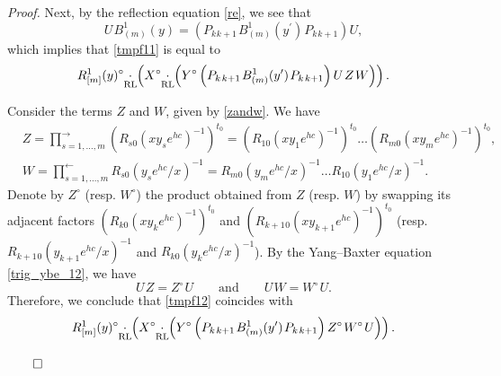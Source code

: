 \documentclass[12pt,a4paper,reqno]{amsart}
\theoremstyle{stil}
\theoremstyle{defi}
\theoremstyle{defi}
\theoremstyle{stil}
\theoremstyle{stil}
\theoremstyle{stil}
\theoremstyle{prim}
\newenvironment{prf}{\noindent \textit{Proof.}}{\null\hfill$\qed$\hskip
2mm\vskip 2mm}
\newcommand{\Fand}{\qquad\text{and}\qquad}
\newcommand{\beq}{\begin{equation}}
\newcommand{\eeq}{\end{equation}}
\newcommand{\ts}{\hspace{1pt}}
\newcommand{\cdotrl}{\mathop{\hspace{-2pt}\underset{\text{RL}}{\cdot}\hspace{-2pt}}}
\begin{document}
\begin{prf}
Next, by the reflection equation \eqref{re}, we see that
$$
U\ts B_{(m)}^1(y)=\left(P_{k\ts k+1}\ts
B_{(m)}^1(y^\prime)\ts
P_{k\ts k+1}\right) U,
$$
which implies that \eqref{tmpf11} is equal to
\beq\label{tmpf12}
	R_{[m]}^1 (y)^\circ \cdotrl 
\left(X^\circ \cdotrl\left(
 Y^\circ   \left(P_{k\ts k+1}\ts
B_{(m)}^1(y^\prime)\ts
P_{k\ts k+1}\right)  U\ts Z  \ts W \right) 
\right).
\eeq

Consider the terms $Z$ and $W$, given by \eqref{zandw}.
We have
\begin{align*}
& Z=\prod_{s=1,\ldots ,m  }^{\longrightarrow}
\left(R_{s0}(xy_s e^{ hc })^{-1}\right)^{t_0}=
\left(R_{10}(xy_1 e^{ hc })^{-1}\right)^{t_0}\ldots 
\left(R_{m0}(xy_m e^{ hc })^{-1}\right)^{t_0},\\
&W=\prod_{s=1,\ldots ,m  }^{\longleftarrow}
R_{s0}( y_s e^{ hc }/x)^{-1} 
=R_{m0}( y_m e^{ hc }/x)^{-1}  \ldots
 R_{10}( y_1 e^{ hc }/x)^{-1}  
.
\end{align*}
Denote by $Z^\circ$ (resp.  $W^\circ$) the  product obtained from $Z$ (resp. $W$) by swapping its adjacent factors 
$\left(R_{k0}(xy_k e^{ hc })^{-1}\right)^{t_0}$ and $\left(R_{k+1\ts 0}(xy_{k+1} e^{ hc })^{-1}\right)^{t_0}$
(resp. $R_{k+1\ts 0}( y_{k+1} e^{ hc }/x)^{-1}$ and $R_{k0}( y_k e^{ hc }/x)^{-1}$).
 By the Yang--Baxter equation \eqref{trig_ybe_12}, we have
$$
U\ts Z =Z^\circ \ts U\Fand
U\ts W =W^\circ \ts  U.
$$
Therefore, we conclude that \eqref{tmpf12} coincides with
\beq\label{tmpf13}
	R_{[m]}^1 (y)^\circ \cdotrl 
\left(X^\circ \cdotrl\left(
 Y^\circ   \left(P_{k\ts k+1}\ts
B_{(m)}^1(y^\prime)\ts
P_{k\ts k+1}\right)    Z^\circ  \ts W^\circ \ts U\right) 
\right).
\eeq


\end{prf}
\end{document}
